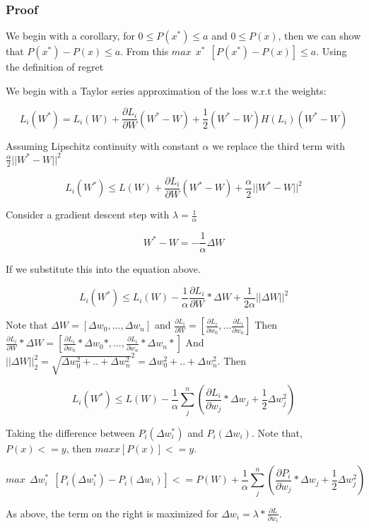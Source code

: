\documentclass{article}
\begin{document}
\subsubsection{Proof}

We begin with a corollary, for $0 \leq P(x^*) \leq a$ and $0 \leq P(x)$, then we can show that $P(x^*) - P(x) \leq a$. From this $ max \ \ x^* \ \ [ P(x^*) - P(x) ] \leq a$. Using the definition of regret 

We begin with a Taylor series approximation of the loss w.r.t the weights:

\[L_i(W^*) = L_i(W) +  \frac{\partial L_i}{\partial W} (W^* - W) + \frac{1}{2}(W^* - W) H(L_i) (W^* - W) \]

Assuming Lipschitz continuity with constant $\alpha$ we replace the third term with $\frac{\alpha}{2} ||W^* - W||^2$

\[L_i(W^*) \leq L(W) + \frac{\partial L_i}{\partial W} (W^* - W) + \frac{\alpha}{2} ||W^* - W||^2 \]

Consider a gradient descent step with $\lambda = \frac{1}{\alpha}$

\[W^* - W  =  -\frac{1}{\alpha} \Delta W \] 

If we substitute this into the equation above.

\[ L_i(W^*) \leq L_i(W) - \frac{1}{\alpha} \frac{\partial L_i}{\partial W} * \Delta W + \frac{1}{2\alpha} || \Delta W ||^2 \]

Note that $\Delta W = [\Delta w_0, ... , \Delta w_n]$ and $\frac{\partial L_i}{\partial W} = [\frac{\partial L_i}{\partial w_0}, ... \frac{\partial L_i}{\partial w_n}]$ Then $\frac{\partial L_i}{\partial W} * \Delta W = [\frac{\partial L_i}{\partial w_0} * \Delta w_0 *, ... , \frac{\partial L_i}{\partial w_n} * \Delta w_n *]$ And $||\Delta W ||_2^2 = \sqrt{\Delta w_0^2 + .. + \Delta w_n^2}^2 = \Delta w_0^2 + .. + \Delta w_n^2$. Then

\[ L_i(W^*) \leq L(W) - \frac{1}{\alpha} \sum_{j}^{n} (\frac{\partial L_i}{\partial w_j} * \Delta w_j + \frac{1}{2} \Delta w_j^2)  \]

Taking the difference between $P_i(\Delta w_i^*)$ and $P_i(\Delta w_i)$. Note that, $P(x) <= y$, then $max x [ P(x) ] <= y$.

\[ max \ \ \Delta w_i^* \ \ [P_i(\Delta w_i^*) - P_i(\Delta w_i)] <= P(W) + \frac{1}{\alpha} \sum_{j}^{n} (\frac{\partial P_i}{\partial w_j} * \Delta w_j + \frac{1}{2} \Delta w_j^2) \]

As above, the term on the right is maximized for $\Delta w_i = \lambda * \frac{\partial L}{\partial w_i}$.
\end{document}
